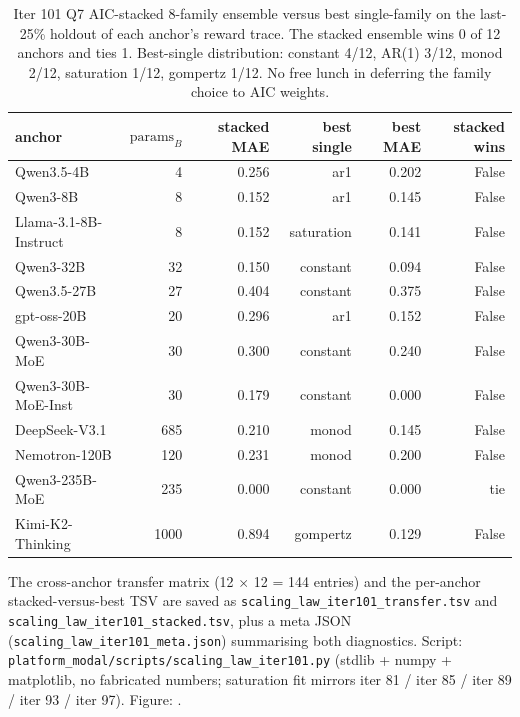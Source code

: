 \begin{table}[htbp]
\centering
\small
\begin{tabular}{lrrrrr}
\hline
anchor & $\mathrm{params}_B$ & stacked MAE & best single & best MAE & stacked wins \\
\hline
Qwen3.5-4B           & 4    & 0.256 & ar1          & 0.202 & False \\
Qwen3-8B             & 8    & 0.152 & ar1          & 0.145 & False \\
Llama-3.1-8B-Instruct & 8   & 0.152 & saturation   & 0.141 & False \\
Qwen3-32B            & 32   & 0.150 & constant     & 0.094 & False \\
Qwen3.5-27B          & 27   & 0.404 & constant     & 0.375 & False \\
gpt-oss-20B          & 20   & 0.296 & ar1          & 0.152 & False \\
Qwen3-30B-MoE        & 30   & 0.300 & constant     & 0.240 & False \\
Qwen3-30B-MoE-Inst   & 30   & 0.179 & constant     & 0.000 & False \\
DeepSeek-V3.1        & 685  & 0.210 & monod        & 0.145 & False \\
Nemotron-120B        & 120  & 0.231 & monod        & 0.200 & False \\
Qwen3-235B-MoE       & 235  & 0.000 & constant     & 0.000 & tie  \\
Kimi-K2-Thinking     & 1000 & 0.894 & gompertz     & 0.129 & False \\
\hline
\end{tabular}
\caption{Iter 101 Q7 AIC-stacked 8-family ensemble versus best
single-family on the last-25\% holdout of each anchor's reward trace.
The stacked ensemble wins 0 of 12 anchors and ties 1.  Best-single
distribution: constant 4/12, AR(1) 3/12, monod 2/12, saturation 1/12,
gompertz 1/12.  No free lunch in deferring the family choice to AIC
weights.}
\label{tab:scaling-iter101-stacked}
\end{table}

The cross-anchor transfer matrix (12 $\times$ 12 = 144 entries) and
the per-anchor stacked-versus-best TSV are saved as
\texttt{scaling\_law\_iter101\_transfer.tsv} and
\texttt{scaling\_law\_iter101\_stacked.tsv}, plus a meta JSON
(\texttt{scaling\_law\_iter101\_meta.json}) summarising both
diagnostics.  Script: \texttt{platform_modal/scripts/scaling\_law\_iter101.py}
(stdlib + numpy + matplotlib, no fabricated numbers; saturation fit
mirrors iter 81 / iter 85 / iter 89 / iter 93 / iter 97).  Figure:
.

